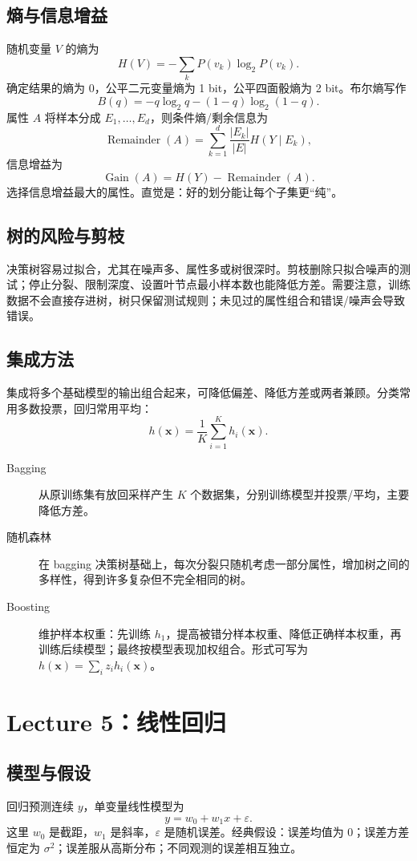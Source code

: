 \documentclass[UTF8,11pt,a4paper]{ctexart}
\begin{document}
\subsection{熵与信息增益}
随机变量 $V$ 的熵为
\[
H(V)=-\sum_kP(v_k)\log_2P(v_k).
\]
确定结果的熵为 0，公平二元变量熵为 1 bit，公平四面骰熵为 2 bit。布尔熵写作
\[
B(q)=-q\log_2q-(1-q)\log_2(1-q).
\]
属性 $A$ 将样本分成 $E_1,\ldots,E_d$，则条件熵/剩余信息为
\[
\operatorname{Remainder}(A)=\sum_{k=1}^{d}\frac{|E_k|}{|E|}H(Y\mid E_k),
\]
信息增益为
\[
\operatorname{Gain}(A)=H(Y)-\operatorname{Remainder}(A).
\]
选择信息增益最大的属性。直觉是：好的划分能让每个子集更“纯”。

\subsection{树的风险与剪枝}
决策树容易过拟合，尤其在噪声多、属性多或树很深时。剪枝删除只拟合噪声的测试；停止分裂、限制深度、设置叶节点最小样本数也能降低方差。需要注意，训练数据不会直接存进树，树只保留测试规则；未见过的属性组合和错误/噪声会导致错误。

\subsection{集成方法}
集成将多个基础模型的输出组合起来，可降低偏差、降低方差或两者兼顾。分类常用多数投票，回归常用平均：
\[
h(\bm{x})=\frac1K\sum_{i=1}^Kh_i(\bm{x}).
\]
\begin{description}
\item[Bagging] 从原训练集有放回采样产生 $K$ 个数据集，分别训练模型并投票/平均，主要降低方差。
\item[随机森林] 在 bagging 决策树基础上，每次分裂只随机考虑一部分属性，增加树之间的多样性，得到许多复杂但不完全相同的树。
\item[Boosting] 维护样本权重：先训练 $h_1$，提高被错分样本权重、降低正确样本权重，再训练后续模型；最终按模型表现加权组合。形式可写为 $h(\bm{x})=\sum_i z_i h_i(\bm{x})$。
\end{description}

\section{Lecture 5：线性回归}
\subsection{模型与假设}
回归预测连续 $y$，单变量线性模型为
\[
y=w_0+w_1x+\varepsilon.
\]
这里 $w_0$ 是截距，$w_1$ 是斜率，$\varepsilon$ 是随机误差。经典假设：误差均值为 0；误差方差恒定为 $\sigma^2$；误差服从高斯分布；不同观测的误差相互独立。
\end{document}

